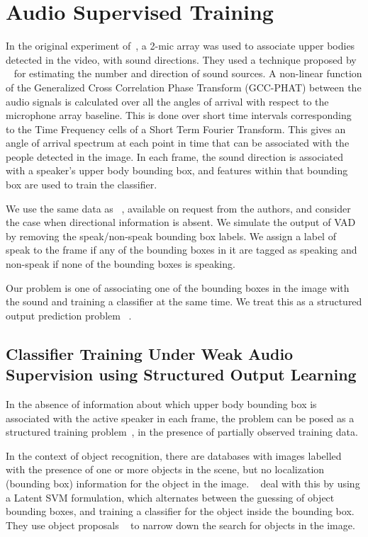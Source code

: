 \documentclass[runningheads]{llncs}
\begin{document}
\section{Audio Supervised Training}
\label{audioTraining}


In the original experiment of~\cite{Chakravarty15}, a 2-mic array was used to associate upper bodies detected in the video, with sound directions.
They used a technique proposed by ~\cite{Sayeh14} for estimating the number and direction of sound sources. A non-linear function of the Generalized Cross Correlation Phase Transform (GCC-PHAT) between the audio signals is calculated over all the angles of arrival with respect to the microphone array baseline. This is done over short time intervals corresponding to the Time Frequency cells of a Short Term Fourier Transform. This gives an angle of arrival spectrum at each point in time that can be associated with the people detected in the image.
In each frame, the sound direction is associated with a speaker's upper body bounding box, and features within that bounding box are used to train the classifier.

We use the same data as ~\cite{Chakravarty15}, available on request from the authors, and consider the case when directional information is absent. We simulate the output of VAD by removing the speak/non-speak bounding box labels. We assign a label of speak to the frame if any of the bounding boxes in it are tagged as speaking and non-speak if none of the bounding boxes is speaking.

Our problem is one of associating one of the bounding boxes in the image with the sound and training a classifier at the same time.
We treat this  as a structured output prediction problem ~\cite{Pletscher10}.


\subsection{Classifier Training Under Weak Audio Supervision using Structured Output Learning}
\label{latentSVM}

In the absence of information about which upper body bounding box is associated
with the active speaker in each frame, the problem can be posed as a structured
training problem~\cite{Bilen14a,Bilen14,Bilen15,Nguyen09}, in the presence of partially observed training data. 

In the context of object recognition, there are databases with images labelled with the presence of one or more objects in the scene, but no localization (bounding box) information for the object in the image. ~\cite{Bilen14a,Bilen14,Bilen15} deal with this by using a Latent SVM formulation, which alternates between the guessing of object bounding boxes, and training a classifier for the object inside the bounding box. They use object proposals ~\cite{Uijlings13} to narrow down the search for objects in the image. 
\end{document}
